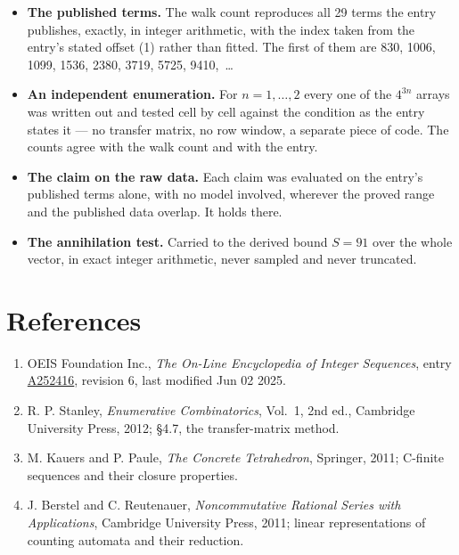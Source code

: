 \documentclass[11pt]{article}
\theoremstyle{definition}
\begin{document}
\begin{itemize}

\item {\bfseries The published terms.} The walk count reproduces all 29 terms the entry publishes, exactly, in integer arithmetic, with the index taken from the entry's stated offset (1) rather than fitted. The first of them are 830, 1006, 1099, 1536, 2380, 3719, 5725, 9410,~\dots

\item {\bfseries An independent enumeration.} For $n = 1,\dots,2$ every one of the $4^{3n}$ arrays was written out and tested cell by cell against the condition as the entry states it --- no transfer matrix, no row window, a separate piece of code. The counts agree with the walk count and with the entry.

\item {\bfseries The claim on the raw data.} Each claim was evaluated on the entry's published terms alone, with no model involved, wherever the proved range and the published data overlap. It holds there.

\item {\bfseries The annihilation test.} Carried to the derived bound $S = 91$ over the whole vector, in exact integer arithmetic, never sampled and never truncated.

\end{itemize}

\section{References}

\begin{enumerate}

\item OEIS Foundation Inc., \emph{The On-Line Encyclopedia of Integer Sequences}, entry \href{https://oeis.org/A252416}{A252416}, revision 6, last modified Jun 02 2025.

\item R. P. Stanley, \emph{Enumerative Combinatorics}, Vol.~1, 2nd ed., Cambridge University Press, 2012; \S4.7, the transfer-matrix method.

\item M. Kauers and P. Paule, \emph{The Concrete Tetrahedron}, Springer, 2011; C-finite sequences and their closure properties.

\item J. Berstel and C. Reutenauer, \emph{Noncommutative Rational Series with Applications}, Cambridge University Press, 2011; linear representations of counting automata and their reduction.

\end{enumerate}
\end{document}
